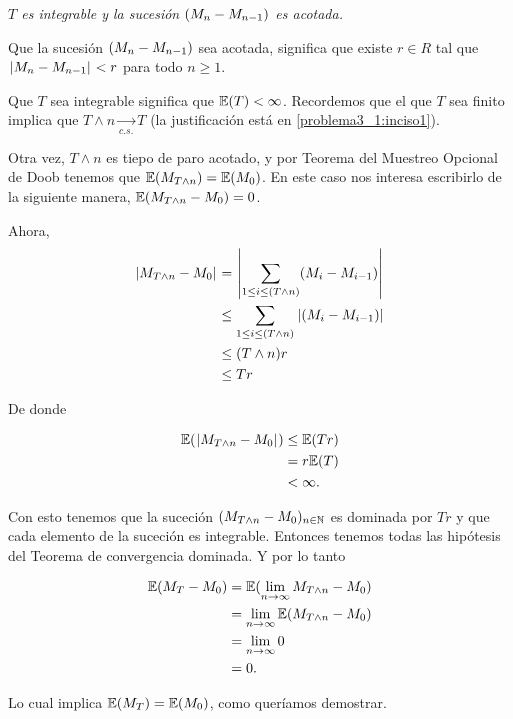 \emph{
    $T$ es integrable y la sucesi\'on $\left( M_n-M_{n-1}\right) $ es acotada.
}

Que la sucesión $\left( M_n-M_{n-1}\right) $ sea acotada, significa que existe $r \in R$ tal que
$\hspace{.25mm}\left|M_n - M_{n-1}\right|\hspace{.25mm} < r$ para todo $n \geq 1$.\pn

Que $T$ sea integrable significa que $\mathbb{E}(T) < \infty$. Recordemos que el que $T$ sea finito implica que 
$T \wedge n \underset{c.s.}\longrightarrow T$ (la justificación está en \ref{problema3_1:inciso1}). \pn

Otra vez, $T \wedge n$ es tiepo de paro acotado, y por Teorema del Muestreo Opcional de Doob tenemos que 
$\mathbb{E}(M_{T \wedge n}) = \mathbb{E}(M_0)$. En este caso nos interesa escribirlo de la siguiente manera, 
$\mathbb{E}(M_{T \wedge n} - M_0) = 0$.\pn

Ahora, 
\begin{align}
    \hspace{.25mm}\left|M_{T \wedge n} - M_0\right|\hspace{.25mm}  &=      \hspace{.25mm}\left|\sum_{1 \leq i \leq (T \wedge n)} (M_i - M_{i-1})\right|\hspace{.25mm}     \\
                                &\leq   \sum_{1 \leq i \leq (T \wedge n)} \hspace{.25mm}\left|(M_i - M_{i-1})\right|\hspace{.25mm}     \\
                                &\leq   (T \wedge n) r                                              \\      
                                &\leq   T r                                                    
\end{align}

De donde 

\begin{align}
        \mathbb{E}(\hspace{.25mm}\left|M_{T \wedge n} - M_0\right|\hspace{.25mm})  &\leq   \mathbb{E}(T r) \\
                                        &= r \mathbb{E}(T)      \\
                                        &< \infty.
\end{align} \pn

Con esto tenemos que la suceción $(M_{T \wedge n} - M_0)_{n \in \mathbb{N}}$ es dominada por $Tr$ y que cada 
elemento de la suceción es integrable. Entonces tenemos todas las hipótesis del Teorema de convergencia dominada.
Y por lo tanto

\begin{align}
        \mathbb{E}(M_T - M_0)   &=  \mathbb{E}(\lim_{n \rightarrow \infty} M_{T \wedge n} - M_0)        \\
                        &=  \lim_{n \rightarrow \infty} \mathbb{E}(M_{T \wedge n} - M_0)        \\
                        &=  \lim_{n \rightarrow \infty} 0                               \\
                        &=  0.                        
\end{align}\pn

Lo cual implica $\mathbb{E}(M_T) = \mathbb{E}(M_0)$, como queríamos demostrar.